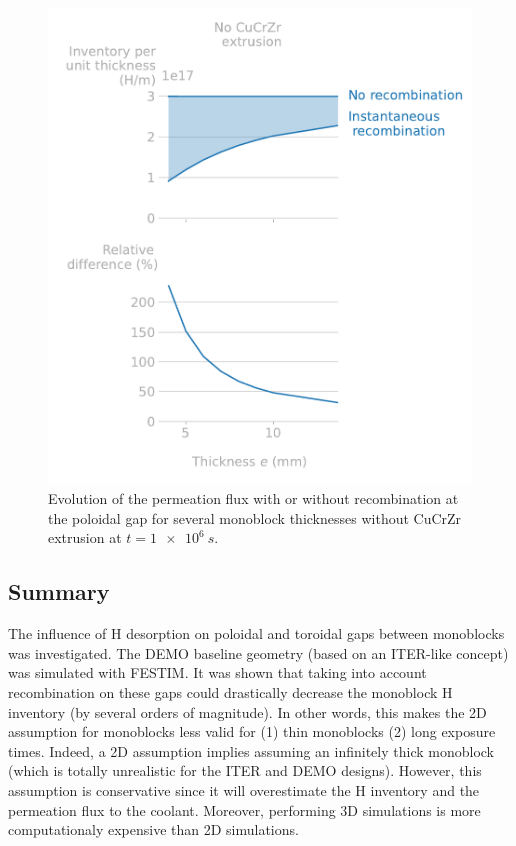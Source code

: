 \begin{figure} [h]
    \centering
    \includegraphics[width=\linewidth]{Figures/Chapter3/monoblocks/3D_monoblocks/inventory_vs_thickness_no_gap.pdf}
    \caption{Evolution of the permeation flux with or without recombination at the poloidal gap for several monoblock thicknesses without CuCrZr extrusion at $t=\SI{1e6}{s}$.}
    \label{fig: inventory monoblock vs thickness no gap}
\end{figure}

\subsection{Summary}
The influence of H desorption on poloidal and toroidal gaps between monoblocks was investigated.
The DEMO baseline geometry (based on an ITER-like concept) was simulated with FESTIM.
It was shown that taking into account recombination on these gaps could drastically decrease the monoblock H inventory (by several orders of magnitude).
In other words, this makes the 2D assumption for monoblocks less valid for (1) thin monoblocks (2) long exposure times.
Indeed, a 2D assumption implies assuming an infinitely thick monoblock (which is totally unrealistic for the ITER and DEMO designs).
However, this assumption is conservative since it will overestimate the H inventory and the permeation flux to the coolant.
Moreover, performing 3D simulations is more computationaly expensive than 2D simulations.

